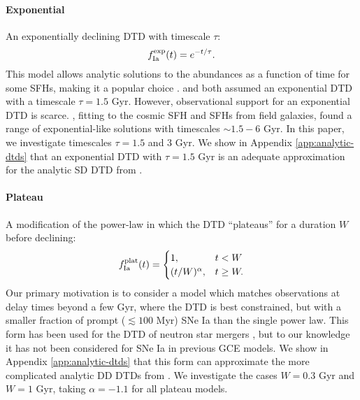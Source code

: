 \documentclass[twocolumn,twocolappendix]{aastex631}
\begin{document}
\paragraph{Exponential} An exponentially declining DTD with timescale $\tau$:
\begin{equation}
    f_{\rm Ia}^{\rm exp}(t) = e^{-t/\tau}.
    \label{eq:exponential-dtd}
\end{equation}
This model allows analytic solutions to the abundances as a function of time for some SFHs, making it a popular choice \citep[e.g.,][]{Weinberg2017-ChemicalEquilibrium,Pantoni2019-AnalyticSolutions,Palicio2023-AnalyticDTD}. \citet{Schonrich2009-RadialMixing} and \citet{Weinberg2017-ChemicalEquilibrium} both assumed an exponential DTD with a timescale $\tau=1.5$ Gyr. However, observational support for an exponential DTD is scarce. \citet{Strolger2020-ExponentialDTD}, fitting to the cosmic SFH and SFHs from field galaxies, found a range of exponential-like solutions with timescales $\sim 1.5 - 6$ Gyr.
In this paper, we investigate timescales $\tau=1.5$ and 3 Gyr. We show in Appendix \ref{app:analytic-dtds} that an exponential DTD with $\tau=1.5$ Gyr is an adequate approximation for the analytic SD DTD from \citet{Greggio2005-AnalyticalRates}.

\paragraph{Plateau} A modification of the power-law in which the DTD ``plateaus'' for a duration $W$ before declining:
\begin{equation}
    f_{\rm Ia}^{\rm plat}(t) =
    \begin{cases}
        1, & t < W \\
        (t/W)^\alpha, & t \ge W.
    \end{cases}
    \label{eq:plateau-dtd}
\end{equation}
Our primary motivation is to consider a model which matches observations at delay times beyond a few Gyr, where the DTD is best constrained, but with a smaller fraction of prompt ($\lesssim 100$ Myr) SNe Ia than the single power law. This form has been used for the DTD of neutron star mergers \citep{Simonetti2019-NeutronStarDTD}, but to our knowledge it has not been considered for SNe Ia in previous GCE models. We show in Appendix \ref{app:analytic-dtds} that this form can approximate the more complicated analytic DD DTDs from \citet{Greggio2005-AnalyticalRates}. We investigate the cases $W=0.3$ Gyr and $W=1$ Gyr, taking $\alpha=-1.1$ for all plateau models.
\end{document}
